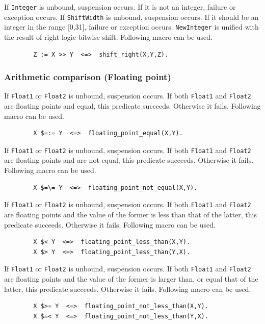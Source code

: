 \begin{itemize}
\index{\verb|<<|}
If \verb|Integer| is unbound, suspension occurs.
If it is not an integer, failure or exception occurs.
If \verb|ShiftWidth| is unbound, suspension occurs.
If it should be an integer in the range [0,31], failure or exception occurs.
\verb|NewInteger| is unified with the result of right logic bitwise shift.
Following macro can be used.
\begin{verbatim}
        Z := X >> Y  <=>  shift_right(X,Y,Z).
\end{verbatim}

\index{\verb|>>|}
\end{itemize}
\subsubsection{Arithmetic comparison (Floating point)}
\begin{itemize}

If \verb|Float1| or \verb|Float2| is unbound, suspension occurs.
If both \verb|Float1| and \verb|Float2| are floating points and equal,
this predicate succeeds. Otherwise it fails. Following macro can be used.
\begin{verbatim}
        X $=:= Y  <=>  floating_point_equal(X,Y).
\end{verbatim}

\index{\verb|$=:=|}
If \verb|Float1| or \verb|Float2| is unbound, suspension occurs.
If both \verb|Float1| and \verb|Float2| are floating points and are not equal,
this predicate succeeds. Otherwise it fails. Following macro can be used.
\begin{verbatim}
        X $=\= Y  <=>  floating_point_not_equal(X,Y).
\end{verbatim}

\index{\verb|$=\=|}
If \verb|Float1| or \verb|Float2| is unbound, suspension occurs.
If both \verb|Float1| and \verb|Float2| are floating points 
and the value of the former is less than that of the latter,
this predicate succeeds. Otherwise it fails. Following macro can be used.
\begin{verbatim}
        X $< Y  <=>  floating_point_less_than(X,Y).
        X $> Y  <=>  floating_point_less_than(Y,X).
\end{verbatim}

\index{\verb|$<|} \index{\verb|$>|}
If \verb|Float1| or \verb|Float2| is unbound, suspension occurs.
If both \verb|Float1| and \verb|Float2| are floating points 
and the value of the former is larger than, or equal that of the latter,
this predicate succeeds. Otherwise it fails. Following macro can be used.
\begin{verbatim}
        X $>= Y  <=>  floating_point_not_less_than(X,Y).
        X $=< Y  <=>  floating_point_not_less_than(Y,X).
\end{verbatim}

\index{\verb|$>=|} \index{\verb|$=<|}
\end{itemize}
